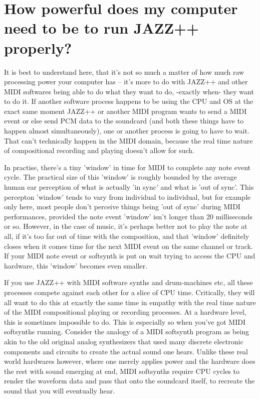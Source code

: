\documentclass[letterpaper]{report}
\begin{document}
\section{How powerful does my computer need to be to run JAZZ++ properly?}


It is best to understand here, that it's not so much a matter of how much raw
processing power your computer has -- it's more to do with JAZZ++ and other
MIDI softwares being able to do what they want to do, -exactly when- they want
to do it. If another software process happens to be using the CPU and OS at the
exact same moment JAZZ++ or another MIDI program wants to send a MIDI event or
else send PCM data to the soundcard (and both these things have to happen
almost simultaneously), one or another process is going to have to wait. That
can't technically happen in the MIDI domain, because the real time nature of
compositional recording and playing doesn't allow for such.

In practise, there's a tiny 'window' in time for MIDI to complete any note
event cycle. The practical size of this 'window' is roughly bounded by the
average human ear perception of what is actually 'in sync' and what is 'out of
sync'. This percepton 'window' tends to vary from individual to individual,
but for example only here, most people don't perceive things being 'out of
sync' during MIDI performances, provided the note event 'window' isn't longer
than 20 milliseconds or so. However, in the case of music, it's perhaps better
not to play the note at all, if it's too far out of time with the composition,
and that 'window' definitely closes when it comes time for the next MIDI event
on the same channel or track. If your MIDI note event or softsynth is put on
wait trying to access the CPU and hardware, this 'window' becomes even smaller.

If you use JAZZ++ with MIDI software synths and drum-machines etc, all these
processes compete against each other for a slice of CPU time. Critically, they
will all want to do this at exactly the same time in empathy with the real time
nature of the MIDI compositional playing or recording processes. At a hardware
level, this is sometimes impossible to do. This is especially so when you've
got MIDI softsynths running. Consider the analogy of a MIDI softsynth program
as being akin to the old original analog synthesizers that used many discrete
electronic components and circuits to create the actual sound one hears. Unlike
these real world hardwares however, where one merely applies power and the
hardware does the rest with sound emerging at end, MIDI softsynths require CPU
cycles to render the waveform data and pass that onto the soundcard itself, to
recreate the sound that you will eventually hear.
\end{document}
